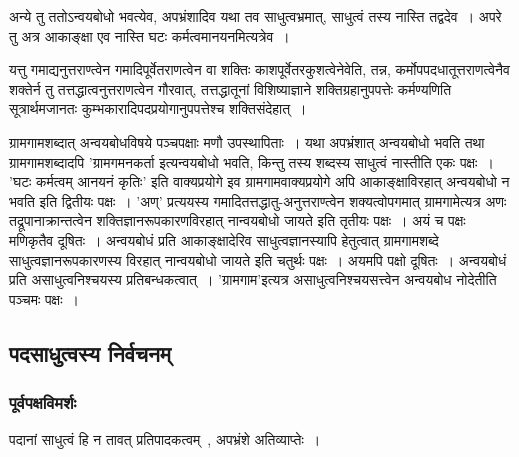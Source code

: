 				\begin{small}
			
					अन्ये तु ततोऽन्वयबोधो भवत्येव, अपभ्रंशादिव यथा तव साधुत्वभ्रमात्, साधुत्वं तस्य नास्ति तद्वदेव~। अपरे तु अत्र आकाङ्क्षा एव नास्ति घटः कर्मत्वमानयनमित्यत्रेव~।
 
					यत्तु गमाद्यनुत्तराण्त्वेन गमादिपूर्वेतराणत्वेन वा शक्तिः काशपूर्वेतरकुशत्वेनेवेति, तन्न, कर्मोपपदधातूत्तराणत्वेनैव शक्तेर्न तु तत्तद्धात्वनुत्तराणत्वेन गौरवात्, तत्तद्धातूनां विशिष्याज्ञाने शक्तिग्रहानुपपत्तेः कर्मण्यणिति सूत्रार्थमजानतः कुम्भकारादिपदप्रयोगानुपपत्तेश्च शक्तिसंदेहात्~।    
				\end{small}
			
				ग्रामगामशब्दात् अन्वयबोधविषये पञ्चपक्षाः मणौ उपस्थापिताः~। यथा अपभ्रंशात् अन्वयबोधो भवति तथा ग्रामगामशब्दादपि ’ग्रामगमनकर्ता इत्यन्वयबोधो भवति, किन्तु तस्य शब्दस्य साधुत्वं नास्तीति एकः पक्षः~। ’घटः कर्मत्वम् आनयनं कृतिः’ इति वाक्यप्रयोगे इव ग्रामगामवाक्यप्रयोगे अपि आकाङ्क्षाविरहात् अन्वयबोधो न भवति इति द्वितीयः पक्षः~। ’अण्’ प्रत्ययस्य गमादितत्तद्धातु-अनुत्तराण्त्वेन शक्यत्वोपगमात् ग्रामगामेत्यत्र अणः तद्रूपानाक्रान्तत्वेन शक्तिज्ञानरूपकारणविरहात् नान्वयबोधो जायते इति तृतीयः पक्षः~। अयं च पक्षः मणिकृतैव दूषितः~। अन्वयबोधं प्रति आकाङ्क्षादेरिव साधुत्वज्ञानस्यापि हेतुत्वात् ग्रामगामशब्दे साधुत्वज्ञानरूपकारणस्य विरहात् नान्वयबोधो जायते इति चतुर्थः पक्षः~। अयमपि पक्षो दूषितः~। अन्वयबोधं प्रति असाधुत्वनिश्चयस्य प्रतिबन्धकत्वात्~। 'ग्रामगाम'इत्यत्र असाधुत्वनिश्चयसत्त्वेन अन्वयबोध नोदेतीति पञ्चमः पक्षः~।
			
		\subsection{पदसाधुत्वस्य निर्वचनम्}
	
			\subsubsection{पूर्वपक्षविमर्शः}
			
				पदानां साधुत्वं हि न तावत् प्रतिपादकत्वम्~, अपभ्रंशे अतिव्याप्तेः~। 


